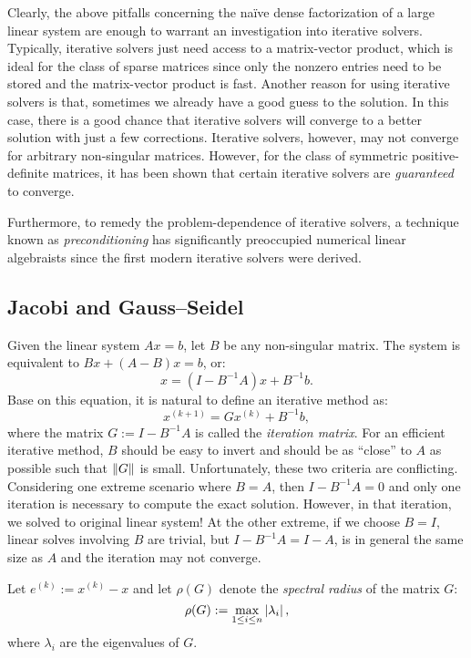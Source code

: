 Clearly, the above pitfalls concerning the na\"ive dense factorization of a large linear system are enough to warrant an investigation into iterative solvers. Typically, iterative solvers just need access to a matrix-vector product, which is ideal for the class of sparse matrices since only the nonzero entries need to be stored and the matrix-vector product is fast. Another reason for using iterative solvers is that, sometimes we already have a good guess to the solution. In this case, there is a good chance that iterative solvers will converge to a better solution with just a few corrections. Iterative solvers, however, may not converge for arbitrary non-singular matrices. However, for the class of symmetric positive-definite matrices, it has been shown that certain iterative solvers are {\em guaranteed} to converge.

Furthermore, to remedy the problem-dependence of iterative solvers, a technique known as {\em preconditioning} has significantly preoccupied numerical linear algebraists since the first modern iterative solvers were derived.

\subsection{Jacobi and Gauss--Seidel}

Given the linear system $Ax=b$, let $B$ be any non-singular matrix. The system is equivalent to $Bx + (A-B)x = b$, or:
\begin{equation}\label{eq:IterationEquivalentSystem}
x = (I-B^{-1}A)x + B^{-1}b.
\end{equation}
Base on this equation, it is natural to define an iterative method as:
\begin{equation}\label{eq:IterativeMethod}
x^{(k+1)} = G x^{(k)} + B^{-1}b,
\end{equation}
where the matrix $G := I-B^{-1}A$ is called the {\em iteration matrix}. For an efficient iterative method, $B$ should be easy to invert and should be as ``close'' to $A$ as possible such that $\left\|{G}\right\|$ is small. Unfortunately, these two criteria are conflicting. Considering one extreme scenario where $B=A$, then $I-B^{-1}A = 0$ and only one iteration is necessary to compute the exact solution. However, in that iteration, we solved to original linear system! At the other extreme, if we choose $B=I$, linear solves involving $B$ are trivial, but $I-B^{-1}A = I-A$, is in general the same size as $A$ and the iteration may not converge.

Let $e^{(k)} := x^{(k)} - x$ and let $\rho(G)$ denote the {\em spectral radius} of the matrix $G$:
\[
\rho(G) := \max_{1\le i\le n}\left|{\lambda_i}\right|,
\]
where $\lambda_i$ are the eigenvalues of $G$. 

